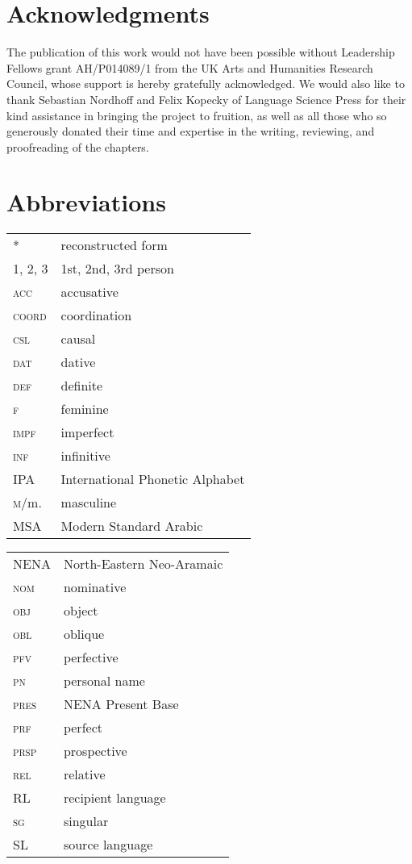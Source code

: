 \documentclass[output=paper]{langsci/langscibook}
\begin{document}
\section*{Acknowledgments}
The publication of this work would not have been possible without Leadership Fellows grant AH/P014089/1 from the UK Arts and Humanities Research Council, whose support is hereby gratefully acknowledged. We would also like to thank Sebastian Nordhoff and Felix Kopecky of Language Science Press for their kind assistance in bringing the project to fruition, as well as all those who so generously donated their time and expertise in the writing, reviewing, and proofreading of the chapters.


\section*{Abbreviations}

\begin{tabularx}{.5\textwidth}[t]{@{}lQ@{}}
*  &  reconstructed form\\
\textsc{1, 2, 3} & 1st, 2nd, 3rd person \\
\textsc{acc} & accusative\\
\textsc{coord} & {coordination}\\
\textsc{csl} & causal \\
\textsc{dat} & dative\\
\textsc{def} & {definite}\\
\textsc{f} & feminine\\
\textsc{impf} & imperfect\\
\textsc{inf} & {infinitive}\\
IPA & International Phonetic Alphabet\\
\textsc{m}/m. & masculine\\
MSA & Modern Standard Arabic
\end{tabularx}%
\begin{tabularx}{.5\textwidth}[t]{@{}lQ@{}}
NENA & North-Eastern Neo-Aramaic\\
\textsc{nom} & nominative\\
\textsc{obj} & object \\
\textsc{obl} & oblique \\
\textsc{pfv} & perfective\\
\textsc{pn} & personal name \\
\textsc{pres}    & NENA Present Base \\
\textsc{prf} & perfect\\
\textsc{prsp} & {prospective}\\
\textsc{rel} & {relative}\\
{RL} & {recipient language}\\
\textsc{sg} & singular\\
{SL} & {source language}\\
\end{tabularx}%

\pagebreak
{\sloppy\printbibliography[heading=subbibliography,notkeyword=this]}
\end{document}
